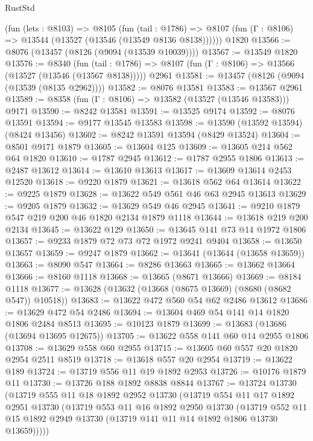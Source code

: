 \begin{lexlean}{RustStd}
\begin{coremodule}
    (fun (lets : @8103) =>
    @8105
      (fun (tail : @1786) =>
      @8107 (fun (Γ : @8106) => @13544 (@13527 (@13546 (@13549 @8136 @8138))))))
    @1820
@13566 := @8076 (@13457 (@8126 (@9094 (@13539 @10039))))
@13567 := @13549 @1820
@13576 := @8340
    (fun (tail : @1786) => @8107 (fun (Γ : @8106) => @13566 (@13527 (@13546 (@13567 @8138)))))
    @2961
@13581 := @13457 (@8126 (@9094 (@13539 (@8135 @2962))))
@13582 := @8076 @13581
@13583 := @13567 @2961
@13589 := @8358 (fun (Γ : @8106) => @13582 (@13527 (@13546 @13583))) @9171
@13590 := @8242 @13581
@13591 := @13525 @9174
@13592 := @8076 @13591
@13594 := @9177 @13545 @13583
@13598 := @13590 (@13592 @13594) (@8424 @13456)
@13602 := @8242 @13591 @13594 (@8429 @13524)
@13604 := @8501 @9171 @1879
@13605 := @13604 @125
@13609 := @13605 @214 @562 @64 @1820
@13610 := @1787 @2945
@13612 := @1787 @2955 @1806
@13613 := @2487 @13612
@13614 := @13610 @13613
@13617 := @13609 @13614 @2453 @12520
@13618 := @9220 @1879
@13621 := @13618 @562 @64 @13614
@13622 := @9225 @1879
@13628 := @13622 @549 @561 @46 @63 @2945 @13613
@13629 := @9205 @1879
@13632 := @13629 @549 @46 @2945
@13641 := @9210 @1879 @547 @219 @200 @46 @1820 @2134 @1879 @1118
@13644 := @13618 @219 @200 @2134
@13645 := @13622 @129
@13650 := @13645 @141 @73 @14 @1972 @1806
@13657 := @9233 @1879 @72 @73 @72 @1972 @9241 @9404
@13658 := @13650 @13657
@13659 := @9247 @1879
@13662 := @13641 (@13644 (@13658 @13659))
@13663 := @8090 @547
@13664 := @8286 @13663
@13665 := @13662 @13664
@13666 := @8160 @1118
@13668 := @13665 (@8671 @13666)
@13669 := @8184 @1118
@13677 := @13628 (@13632 (@13668 (@8675 @13669) (@8680 (@8682 @547)) @10518))
@13683 := @13622 @472 @560 @54 @62 @2486 @13612
@13686 := @13629 @472 @54 @2486
@13694 := @13604 @469 @54 @141 @14 @1820 @1806 @2484 @8513
@13695 := @10123 @1879
@13699 := @13683 (@13686 (@13694 @13695 @12675))
@13705 := @13622 @558 @141 @60 @14 @2955 @1806
@13708 := @13629 @558 @60 @2955
@13715 := @13605 @60 @557 @20 @1820 @2954 @2511 @8519
@13718 := @13618 @557 @20 @2954
@13719 := @13622 @189
@13724 := @13719 @556 @11 @19 @1892 @2953
@13726 := @10176 @1879 @11
@13730 := @13726 @188 @1892 @8838 @8844
@13767 := @13724
    @13730
    (@13719
      @555
      @11
      @18
      @1892
      @2952
      @13730
      (@13719
        @554
        @11
        @17
        @1892
        @2951
        @13730
        (@13719
          @553
          @11
          @16
          @1892
          @2950
          @13730
          (@13719
            @552
            @11
            @15
            @1892
            @2949
            @13730
            (@13719 @141 @11 @14 @1892 @1806 @13730 @13659)))))

\end{coremodule}
\end{lexlean}
